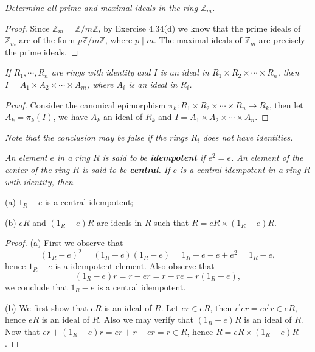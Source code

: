 \begin{problem}\em
Determine all prime and maximal ideals in the ring $\mathbb{Z}_m$.
\end{problem}
\begin{proof}
Since $\mathbb{Z}_m=\mathbb{Z}/m\mathbb{Z}$, by Exercise 4.34(d) we know that the prime ideals of $\mathbb{Z}_m$ are of the form $p\mathbb{Z}/m\mathbb{Z}$, where $p\mid m$. The maximal ideals of $\mathbb{Z}_m$ are precisely the prime ideals.
\end{proof}
\begin{problem}\em
If $R_1,\cdots,R_n$ are rings with identity and $I$ is an ideal in $R_1\times R_2\times\cdots\times R_n$, then $I=A_1\times A_2\times\cdots\times A_m$, where $A_i$ is an ideal in $R_i$.\par
\end{problem}
\begin{proof}
Consider the canonical epimorphism $\pi_k:R_1\times R_2\times\cdots\times R_n\to R_k$, then let $A_k=\pi_k(I)$, we have $A_k$ an ideal of $R_k$ and $I=A_1\times A_2\times\cdots\times A_n$.\par
\end{proof}
\begin{note}\em
Note that the conclusion may be false if the rings $R_i$ does not have identities.
\end{note}
\begin{problem}\em
An element $e$ in a ring $R$ is said to be \textbf{idempotent} if $e^2=e$. An element of the center of the ring $R$ is said to be \textbf{central}. If $e$ is a central idempotent in a ring $R$ with identity, then\par
(a) $1_R-e$ is a central idempotent;\par
(b) $eR$ and $(1_R-e)R$ are ideals in $R$ such that $R=eR\times(1_R-e)R$.
\end{problem}
\begin{proof}
(a) First we observe that 
$$
\left( 1_R-e \right) ^2=\left( 1_R-e \right) \left( 1_R-e \right) =1_R-e-e+e^2=1_R-e,
$$
hence $1_R-e$ is a idempotent element. Also observe that 
$$
\left( 1_R-e \right) r=r-er=r-re=r\left( 1_R-e \right) ,
$$
we conclude that $1_R-e$ is a central idempotent.\par
(b) We first show that $eR$ is an ideal of $R$. Let $er\in eR$, then $r^\prime er=er^\prime r\in eR$, hence $eR$ is an ideal of $R$. Also we may verify that $(1_R-e)R$ is an ideal of $R$. Now that $er+(1_R-e)r=er+r-er=r\in R$, hence $R=eR\times(1_R-e)R$.
\end{proof}
